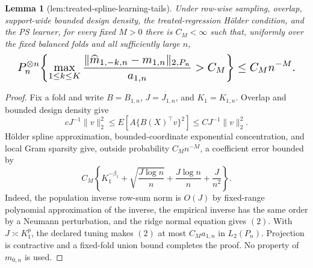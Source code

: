 \documentclass{article}
\newtheorem{lemma}{Lemma}
\begin{document}
\begin{lemma}[lem:treated-spline-learning-tails]\label{lem:treated-spline-learning-tails}
Under row-wise sampling, overlap, support-wide bounded design density, the treated-regression H\"older condition, and the PS learner, for every fixed \(M>0\) there is \(C_M<\infty\) such that, uniformly over the fixed balanced folds and all sufficiently large \(n\),
\[
\makebox[\linewidth][c]{\resizebox{0.98\linewidth}{!}{\par\noindent \makebox[\linewidth][c]{\resizebox{0.98\linewidth}{!}{\(\displaystyle \displaystyle P_n^{\otimes n}\!\left\{\max_{1\le k\le K}\frac{\lVert\widehat m_{1,-k,n}-m_{1,n}\rVert_{2,P_n}}{a_{1,n}}>C_M\right\}\le C_Mn^{-M}.\)}}\par\noindent}}
\]
\end{lemma}
\begin{proof}
Fix a fold and write \(B=B_{1,n}\), \(J=J_{1,n}\), and \(K_1=K_{1,n}\). Overlap and bounded design density give
\[cJ^{-1}\lVert v\rVert_2^2\le E[A\{B(X)^\top v\}^2]\le CJ^{-1}\lVert v\rVert_2^2.\tag{1}\]
H\"older spline approximation, bounded-coordinate exponential concentration, and local Gram sparsity give, outside probability \(C_Mn^{-M}\), a coefficient error bounded by
\[C_M\left\{K_1^{-\beta_1}+\sqrt{\frac{J\log n}{n}}+\frac{J\log n}{n}+\frac{J}{n^2}\right\}.\tag{2}\]
Indeed, the population inverse row-sum norm is \(O(J)\) by fixed-range polynomial approximation of the inverse, the empirical inverse has the same order by a Neumann perturbation, and the ridge normal equation gives \((2)\). With \(J\asymp K_1^p\), the declared tuning makes \((2)\) at most \(C_Ma_{1,n}\) in \(L_2(P_n)\). Projection is contractive and a fixed-fold union bound completes the proof. No property of \(m_{0,n}\) is used.
\end{proof}
\end{document}
